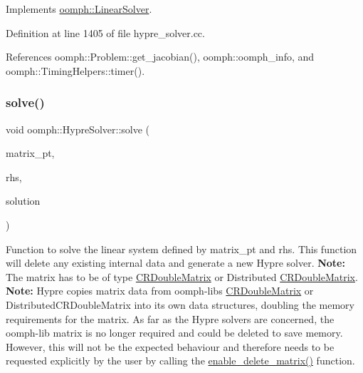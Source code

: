 Implements \hyperlink{classoomph_1_1LinearSolver_a15ce22542b74ed1826ea485edacbeb6e}{oomph\+::\+Linear\+Solver}.



Definition at line 1405 of file hypre\+\_\+solver.\+cc.



References oomph\+::\+Problem\+::get\+\_\+jacobian(), oomph\+::oomph\+\_\+info, and oomph\+::\+Timing\+Helpers\+::timer().

\mbox{\label{classoomph_1_1HypreSolver_a11265eed48a54ba7dfb148d226cb2130}} 
\subsubsection{\texorpdfstring{solve()}{solve()}\hspace{0.1cm}{\footnotesize\ttfamily [2/2]}}
{\footnotesize\ttfamily void oomph\+::\+Hypre\+Solver\+::solve (\begin{DoxyParamCaption}\item[{\hyperlink{classoomph_1_1DoubleMatrixBase}{Double\+Matrix\+Base} $\ast$const \&}]{matrix\+\_\+pt,  }\item[{const \hyperlink{classoomph_1_1DoubleVector}{Double\+Vector} \&}]{rhs,  }\item[{\hyperlink{classoomph_1_1DoubleVector}{Double\+Vector} \&}]{solution }\end{DoxyParamCaption})\hspace{0.3cm}{\ttfamily [virtual]}}



Function to solve the linear system defined by matrix\+\_\+pt and rhs. This function will delete any existing internal data and generate a new Hypre solver. {\bfseries Note\+:} The matrix has to be of type \hyperlink{classoomph_1_1CRDoubleMatrix}{C\+R\+Double\+Matrix} or Distributed \hyperlink{classoomph_1_1CRDoubleMatrix}{C\+R\+Double\+Matrix}. {\bfseries Note\+:} Hypre copies matrix data from oomph-\/lib\textquotesingle{}s \hyperlink{classoomph_1_1CRDoubleMatrix}{C\+R\+Double\+Matrix} or Distributed\+C\+R\+Double\+Matrix into its own data structures, doubling the memory requirements for the matrix. As far as the Hypre solvers are concerned, the oomph-\/lib matrix is no longer required and could be deleted to save memory. However, this will not be the expected behaviour and therefore needs to be requested explicitly by the user by calling the \hyperlink{classoomph_1_1HypreSolver_ae917113f255b23448210530b00f55338}{enable\+\_\+delete\+\_\+matrix()} function. 

